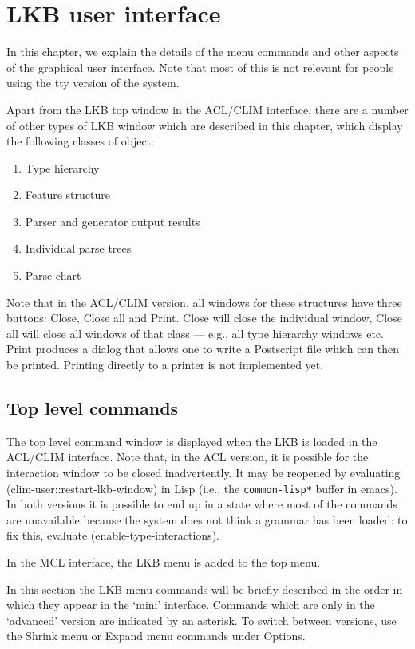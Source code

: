 \documentclass[12pt]{report}
\newcommand{\lkbmenucommand}{{\bf}}
\begin{document}
\chapter{LKB user interface}
\label{ui}

In this chapter, we explain the details of the menu commands
and other aspects of the graphical user interface.
Note that most of this is not relevant for people using the tty version
of the system.

Apart from the LKB top window in the ACL/CLIM interface, there are
a number of other types of LKB window which are described in this chapter,
which display the following classes of object:
\begin{enumerate}
\item Type hierarchy
\item Feature structure 
\item Parser and generator output results
\item Individual parse trees
\item Parse chart
\end{enumerate}
Note that in the ACL/CLIM version, all windows for these structures
have three buttons: {\lkbmenucommand Close}, {\lkbmenucommand Close all}
and {\lkbmenucommand Print}.
{\lkbmenucommand Close} will close the individual window, {\lkbmenucommand Close all}
will close all windows of that class --- e.g., all type hierarchy windows
etc.
{\lkbmenucommand Print} produces a dialog
that allows one to write a Postscript file which can then
be printed.  Printing directly to a printer
is not implemented yet.

\section{Top level commands}

The top level command window is displayed when the LKB is loaded
in the ACL/CLIM interface.
Note that, in the ACL version, it is possible for the interaction
window to be closed inadvertently.
It may be reopened by evaluating
(clim-user::restart-lkb-window) in Lisp (i.e., the
{\tt *common-lisp*} buffer in emacs).
In both versions it is possible to end up in a state 
where most of the commands are unavailable because the system
does not think a grammar has been loaded: to
fix this, evaluate (enable-type-interactions).

In the MCL interface, the LKB menu is added to the top menu.

In this section the LKB menu
commands will be briefly described in the order in
which they appear in the `mini' interface.
Commands which are only in the `advanced' version are indicated by
an asterisk.  To switch between versions, use the {\lkbmenucommand Shrink menu}
or {\lkbmenucommand Expand menu} commands under {\lkbmenucommand Options}.
\end{document}
